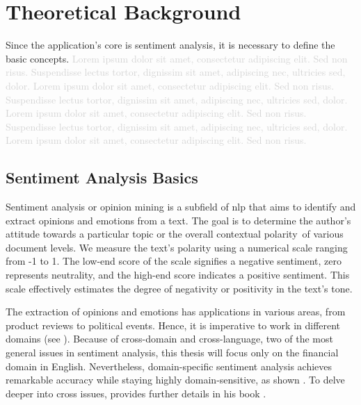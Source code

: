 \chapter{Theoretical Background}
\label{chap:theoretical-background}
Since the application's core is sentiment analysis, it is necessary to define the basic concepts. \textcolor{lightgray}{Lorem ipsum dolor sit amet, consectetur adipiscing elit. Sed non risus. Suspendisse lectus tortor, dignissim sit amet, adipiscing nec, ultricies sed, dolor. Lorem ipsum dolor sit amet, consectetur adipiscing elit. Sed non risus. Suspendisse lectus tortor, dignissim sit amet, adipiscing nec, ultricies sed, dolor. Lorem ipsum dolor sit amet, consectetur adipiscing elit. Sed non risus. Suspendisse lectus tortor, dignissim sit amet, adipiscing nec, ultricies sed, dolor. Lorem ipsum dolor sit amet, consectetur adipiscing elit. Sed non risus.}

\section{Sentiment Analysis Basics}
\label{sec:sentiment-analysis-basics}
Sentiment analysis or opinion mining is a subfield of \acrshort{nlp} that aims to identify and extract opinions and emotions from a text. The goal is to determine the author's attitude towards a particular topic or the overall contextual polarity~of various document levels. We measure the text's polarity using a numerical scale ranging from -1 to 1. The low-end score of the scale signifies a negative sentiment, zero represents neutrality, and the high-end score indicates a positive sentiment. This scale effectively estimates the degree of negativity or positivity in the text's tone. 

The extraction of opinions and emotions has applications in various areas, from product reviews to political events. Hence, it is imperative to work in different domains (see \cite{PIRYANI2017122}). Because of cross-domain and cross-language, two of the most general issues in sentiment analysis, this thesis will focus only on the financial domain in English. Nevertheless, domain-specific sentiment analysis achieves remarkable accuracy while staying highly domain-sensitive, as shown \cite{saunders_2020}. To delve deeper into cross issues, \citeauthor{liu2022sentiment} provides further details in his book .

